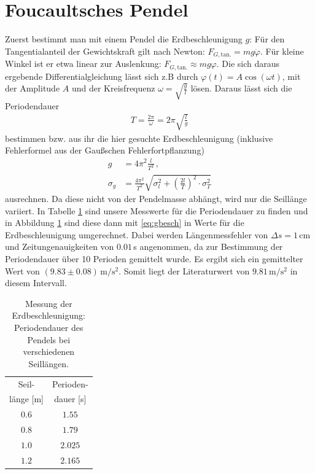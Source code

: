 \documentclass[12pt,a4paper,headinclude,bibtotoc]{scrartcl}
\begin{document}
\section{Foucaultsches Pendel}
Zuerst bestimmt man mit einem Pendel die Erdbeschleunigung $g$:
Für den Tangentialanteil der Gewichtskraft gilt nach Newton: $F_{G,\text{tan.}}=mg \ddot{\varphi}$.
Für kleine Winkel ist er etwa linear zur Auslenkung: $F_{G,\text{tan.}}\approx mg\varphi$.
Die sich daraus ergebende Differentialgleichung lässt sich z.B durch $\varphi(t)=A\cos(\omega t)$, mit der Amplitude $A$ und der Kreisfrequenz $\omega=\sqrt{\frac{g}{l}}$ lösen.
Daraus lässt sich die Periodendauer
\begin{align}
	T =\frac{2\pi}{\omega}= 2\pi \sqrt{\frac{l}{g}}
\end{align}
bestimmen bzw. aus ihr die hier gesuchte Erdbeschleunigung (inklusive Fehlerformel aus der Gaußschen Fehlerfortpflanzung)
\begin{align}
	g &= 4\pi^2 \frac{l}{T^2}\,,\\ \label{eq:gbesch}
	\sigma_g &= \frac{4\pi^2}{T^2} \sqrt{\sigma_l^2+\left(\frac{2l}{T}\right)^2 \cdot\sigma_T^2}
\end{align}
ausrechnen.
Da diese nicht von der Pendelmasse abhängt, wird nur die Seillänge variiert.
In Tabelle \ref{tab:gbesch} sind unsere Messwerte für die Periodendauer zu finden und in Abbildung \ref{tab:gbesch} sind diese dann mit \eqref{eq:gbesch} in Werte für die Erdbeschleunigung umgerechnet.
Dabei werden Längenmessfehler von $\Delta s=1\,$cm und Zeitungenauigkeiten von $0.01\,$s angenommen, da zur Bestimmung der Periodendauer über 10 Perioden gemittelt wurde.
Es ergibt sich ein gemittelter Wert von $(9.83\pm0.08)\,\si{\meter\per\second^2}$.
Somit liegt der Literaturwert von $9.81\,\si{\meter\per\second^2}$ in diesem Intervall.
\begin{table}[!htb]
	\centering
	\begin{tabular}{|c|c|}
		\hline
		Seil- & Perioden- \\
		länge [m] & dauer [s] \\
		\hline
		$0.6$ & $1.55$\\
		$0.8$ & $1.79$\\
		$1.0$ & $2.025$\\
		$1.2$ & $2.165$\\
		\hline
	\end{tabular}
	\caption{Messung der Erdbeschleunigung: Periodendauer des Pendels bei verschiedenen Seillängen.}
	\label{tab:gbesch}
\end{table}
\end{document}
